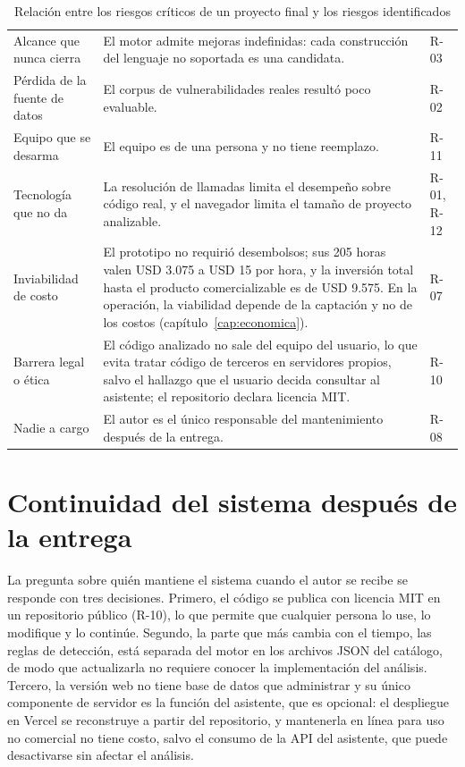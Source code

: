 \begin{table}[H]
    \centering
    \caption{Relación entre los riesgos críticos de un proyecto final y los riesgos identificados}
    \label{tab:riesgos-criticos}
    \small
    \begin{tabularx}{\textwidth}{L L l}
        \toprule
         &  &  \\
        \midrule
        Alcance que nunca cierra & El motor admite mejoras indefinidas: cada construcción del lenguaje no soportada es una candidata. & R-03 \\
        Pérdida de la fuente de datos & El corpus de vulnerabilidades reales resultó poco evaluable. & R-02 \\
        Equipo que se desarma & El equipo es de una persona y no tiene reemplazo. & R-11 \\
        Tecnología que no da & La resolución de llamadas limita el desempeño sobre código real, y el navegador limita el tamaño de proyecto analizable. & R-01, R-12 \\
        Inviabilidad de costo & El prototipo no requirió desembolsos; sus 205 horas valen USD 3.075 a USD 15 por hora, y la inversión total hasta el producto comercializable es de USD 9.575. En la operación, la viabilidad depende de la captación y no de los costos (capítulo~\ref{cap:economica}). & R-07 \\
        Barrera legal o ética & El código analizado no sale del equipo del usuario, lo que evita tratar código de terceros en servidores propios, salvo el hallazgo que el usuario decida consultar al asistente; el repositorio declara licencia MIT. & R-10 \\
        Nadie a cargo & El autor es el único responsable del mantenimiento después de la entrega. & R-08 \\
        \bottomrule
    \end{tabularx}
\end{table}

\section{Continuidad del sistema después de la entrega}\label{sec:n6.6}

La pregunta sobre quién mantiene el sistema cuando el autor se recibe se responde con tres decisiones. Primero, el código se publica con licencia MIT en un repositorio público (R-10), lo que permite que cualquier persona lo use, lo modifique y lo continúe. Segundo, la parte que más cambia con el tiempo, las reglas de detección, está separada del motor en los archivos JSON del catálogo, de modo que actualizarla no requiere conocer la implementación del análisis. Tercero, la versión web no tiene base de datos que administrar y su único componente de servidor es la función del asistente, que es opcional: el despliegue en Vercel se reconstruye a partir del repositorio, y mantenerla en línea para uso no comercial no tiene costo, salvo el consumo de la API del asistente, que puede desactivarse sin afectar el análisis.

